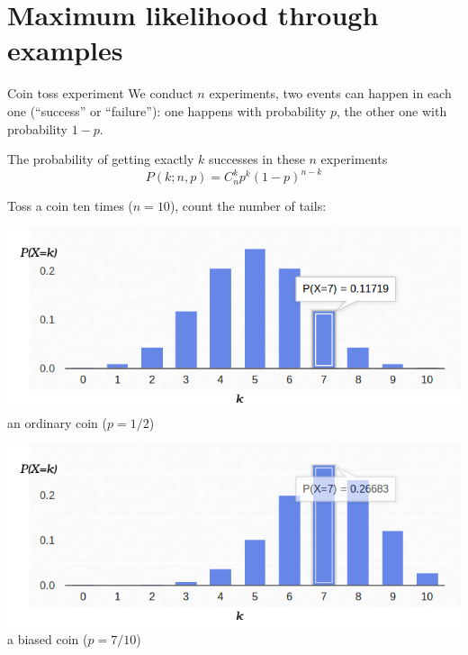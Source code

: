 \documentclass[UKenglish,aspectratio=169]{beamer}
\begin{document}
\section{Maximum likelihood through examples}
\begin{frame}{Coin toss experiment}
We conduct $n$ experiments, two events can happen in each one (``success'' or ``failure''):
one happens with probability $p$, the other one with probability $1-p$.

\pause
\begin{block}{The probability of getting exactly $k$ successes in these $n$ experiments}
$$
P(k;n,p) = C_n^k p^k (1-p)^{n-k}
$$
\end{block}

\pause
Toss a coin ten times ($n=10$), count the number of tails:
\begin{minipage}{.45\linewidth}
\centering
\includegraphics[width=\columnwidth]{../manuscript/img/binomial-05.png}
an ordinary coin ($p=1/2$)
\end{minipage}
\pause
\begin{minipage}{.45\linewidth}
\centering
\includegraphics[width=\columnwidth]{../manuscript/img/binomial-07.png}
a biased coin ($p=7/10$)
\end{minipage}
\end{frame}
\end{document}
